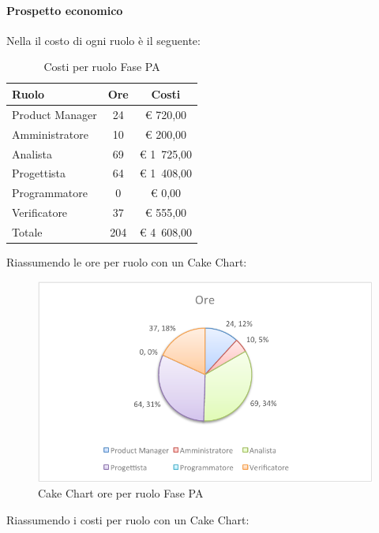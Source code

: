 			\paragraph{Prospetto economico}
				Nella  il costo di ogni ruolo è il seguente:
				\begin{table}[H]
					\begin{center}
						\begin{tabular}{| l | c | c |}
							\hline
							Ruolo 			& Ore 	& Costi  \\ \hline
							
							Product Manager	& 24 		& \euro{} 720,00 	\\
							Amministratore 		& 10 		& \euro{} 200,00 	\\
							Analista	 		& 69 		& \euro{} 1~725,00 	\\
							Progettista 		& 64 		& \euro{} 1~408,00  	\\
							Programmatore		& 0		& \euro{} 0,00	\\
							Verificatore		& 37 		& \euro{} 555,00 	\\ \hline \hline
							
							Totale	 		& 204 	& \euro{} 4~608,00 	\\ \hline
						\end{tabular}
					\end{center}
					\caption{Costi per ruolo Fase PA}
				\end{table}
				Riassumendo le ore per ruolo con un Cake Chart:
				\begin{figure}[H]\centering
					\includegraphics[width=\textwidth]{PianoDiProgetto/Pics/ChartTotOreFasePA.pdf}
					\caption{Cake Chart ore per ruolo Fase PA}
				\end{figure}
				Riassumendo i costi per ruolo con un Cake Chart:
